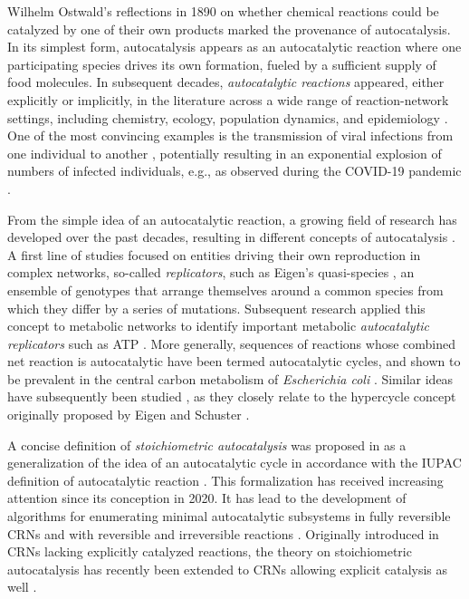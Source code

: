 \documentclass[pdflatex]{sn-jnl}
\theoremstyle{thmstyleone}%
\theoremstyle{examplesty}%
\theoremstyle{thmstylethree}%
\begin{document}
Wilhelm Ostwald's reflections in 1890 on whether chemical reactions
could be catalyzed by one of their own products \cite{Ostwald:90} marked
the provenance of autocatalysis. In its simplest form, autocatalysis
appears as an autocatalytic reaction where one participating species drives
its own formation, fueled by a sufficient supply of food molecules. In
subsequent decades, \emph{autocatalytic reactions} appeared, either
explicitly or implicitly, in the literature across a wide range of
reaction-network settings, including chemistry, ecology, population
dynamics, and epidemiology \cite{lotka_contribution_1910,
  lotka_analytical_1920, lotka1925elements, volterra1926variazioni,
  kermack_contributions_1991}. One of the most convincing examples is the
transmission of viral infections from one individual to another
\cite{kermack_contributions_1991}, potentially resulting in an exponential
explosion of numbers of infected individuals, e.g., as observed during the
COVID-19 pandemic \cite{saxena_propagation_2021}.

From the simple idea of an autocatalytic reaction, a growing field of
research has developed over the past decades, resulting in different
concepts of autocatalysis \cite{andersen_defining_2021}.  A first line of
studies focused on entities driving their own reproduction in complex
networks, so-called \emph{replicators}, such as Eigen's quasi-species
\cite{eigen_selforganization_1971}, an ensemble of genotypes that arrange
themselves around a common species from which they differ by a series of
mutations.  Subsequent research applied this concept to metabolic networks
to identify important metabolic \emph{autocatalytic replicators} such as
ATP \cite{kun_computational_2008}. More generally, sequences of reactions
whose combined net reaction is autocatalytic have been termed autocatalytic
cycles, and shown to be prevalent in the central carbon metabolism of
\emph{Escherichia coli} \cite{barenholz_design_2017,
  smith_universality_2004}. Similar ideas have subsequently been studied
\cite{joshi_autocatalytic_2021}, as they closely relate to the hypercycle
concept originally proposed by Eigen and Schuster
\cite{eigen_principle_1977}.

A concise definition of \emph{stoichiometric autocatalysis} was proposed in
\cite{blokhuis_Universal_2020} as a generalization of the idea of an
autocatalytic cycle in accordance with the IUPAC definition of
autocatalytic reaction \cite{gold_iupac_2025}.  This formalization has
received increasing attention since its conception in 2020. It has lead to
the development of algorithms for enumerating minimal autocatalytic
subsystems in fully reversible \cite{kosc_thermodynamic_2025} CRNs and
with reversible and irreversible reactions \cite{gagrani_polyhedral_2024,
  golnik_birne_2025, golnik_enumeration_2026,
  golnik_using_2026}. Originally introduced in CRNs
lacking explicitly catalyzed reactions, the theory on stoichiometric
autocatalysis has recently been extended to CRNs allowing explicit catalysis as well
\cite{golnik_autocatalytic_2026}.
\end{document}
